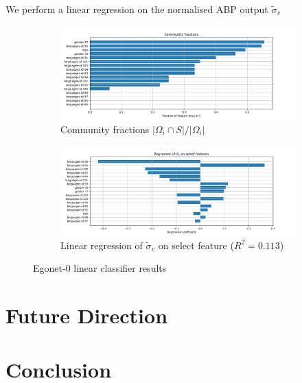 \documentclass[]{article}
\begin{document}
We perform a linear regression on the normalised ABP output $\tilde{\sigma}_v$
%
\begin{figure}[!h]
	\centering
	\begin{subfigure}{0.6\linewidth}
		\includegraphics[width=\linewidth]{ego-0-abp-community-fractions.png}
		\caption{Community fractions $|\Omega_i \cap S| / |\Omega_i|$}
		\label{fig:abp-output-community-fractions}
	\end{subfigure}
	\begin{subfigure}{0.6\linewidth}
		\includegraphics[width=\linewidth]{ego-0-abp-lin-regression.png}
		\caption{Linear regression of $\tilde{\sigma}_v$ on select feature ($R^2 = 0.113$)}
		\label{fig:abp-output-lin-regression}
	\end{subfigure}
	\caption{Egonet-0 linear classifier results}
\end{figure}

\section{Future Direction}

\section{Conclusion}

\nocite{*}
\printbibliography
\end{document}

